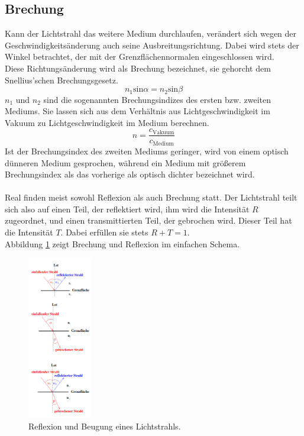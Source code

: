 \subsection{Brechung}
Kann der Lichtstrahl das weitere Medium durchlaufen, verändert sich wegen
der Geschwindigkeitsänderung auch seine Ausbreitungsrichtung. Dabei wird stets
der Winkel betrachtet, der mit der Grenzflächennormalen eingeschlossen wird.\\
Diese Richtungsänderung wird als Brechung bezeichnet, sie gehorcht dem Snellius'schen
Brechungsgesetz.
\begin{equation}
    n_1 \text{sin} \alpha = n_2 \text{sin} \beta
    \label{eqn:snellius}
\end{equation}
$n_1$ und $n_2$ sind die sogenannten Brechungsindizes des ersten bzw. zweiten
Mediums. Sie lassen sich aus dem Verhältnis aus Lichtgeschwindigkeit im Vakuum 
zu Lichtgeschwindigkeit im Medium berechnen.
\begin{equation}
    n = \frac{c_\text{Vakuum}}{c_\text{Medium}}
    \label{eqn:brech}
\end{equation}
Ist der Brechungsindex des zweiten Mediums geringer, wird von 
einem optisch dünneren Medium gesprochen, während ein Medium mit größerem
Brechungsindex als das vorherige als optisch dichter bezeichnet wird.\\
\\
Real finden meist sowohl Reflexion als auch Brechung statt. Der Lichtstrahl teilt
sich also auf einen Teil, der reflektiert wird, ihm wird die Intensität $R$ zugeordnet,
und einen transmittierten Teil, der gebrochen wird. Dieser Teil hat die
Intensität $T$. Dabei erfüllen sie stets $R + T = 1$.\\
Abbildung \ref{fig:schemata} zeigt Brechung und Reflexion im einfachen Schema.

\begin{figure}
    \centering
    \includegraphics[width=0.25\textwidth]{dreidinger.png}
    \caption{Reflexion und Beugung eines Lichtstrahls.}
    \label{fig:schemata}
\end{figure}

